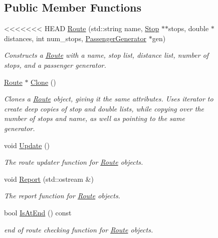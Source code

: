 \begin{figure}[H]
\begin{center}
\subsection*{Public Member Functions}
\begin{DoxyCompactItemize}
\item 
<<<<<<< HEAD
\hyperlink{classRoute_ad1bef6c95f3ca3c2713fba850eee9057}{Route} (std\+::string name, \hyperlink{classStop}{Stop} $\ast$$\ast$stops, double $\ast$distances, int num\+\_\+stops, \hyperlink{classPassengerGenerator}{Passenger\+Generator} $\ast$gen)
\begin{DoxyCompactList}\small\item\em Constructs a \hyperlink{classRoute}{Route} with a name, stop list, distance list, number of stops, and a passenger generator. \end{DoxyCompactList}\item 
\hyperlink{classRoute}{Route} $\ast$ \hyperlink{classRoute_a4031b4a218b1530e28dcf5ee5c6fa8e7}{Clone} ()
\begin{DoxyCompactList}\small\item\em Clones a \hyperlink{classRoute}{Route} object, giving it the same attributes. Uses iterator to create deep copies of stop and double lists, while copying over the number of stops and name, as well as pointing to the same generator. \end{DoxyCompactList}\item 
void \hyperlink{classRoute_a7ecf1d4200f5fe110de4a1d9ea9408c3}{Update} ()
\begin{DoxyCompactList}\small\item\em The route updater function for \hyperlink{classRoute}{Route} objects. \end{DoxyCompactList}\item 
void \hyperlink{classRoute_a6115a741ea15af716c1a624627ec954a}{Report} (std\+::ostream \&)
\begin{DoxyCompactList}\small\item\em The report function for \hyperlink{classRoute}{Route} objects. \end{DoxyCompactList}\item 
bool \hyperlink{classRoute_a529ab995aefd1001b250a6c1ccf77892}{Is\+At\+End} () const
\begin{DoxyCompactList}\small\item\em end of route checking function for \hyperlink{classRoute}{Route} objects. \end{DoxyCompactList}\item 
$$
\end{DoxyCompactItemize}
\end{center}
\end{figure}
